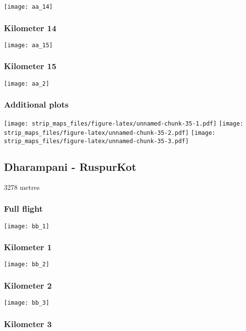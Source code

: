 \documentclass[]{article}
\begin{document}
\texttt{[image: aa\_14]}

\subsubsection{Kilometer 14}\label{kilometer-14}

\texttt{[image: aa\_15]}

\subsubsection{Kilometer 15}\label{kilometer-15}

\texttt{[image: aa\_2]}

\subsubsection{Additional plots}\label{additional-plots-26}

\texttt{[image: strip\_maps\_files/figure-latex/unnamed-chunk-35-1.pdf]}
\texttt{[image: strip\_maps\_files/figure-latex/unnamed-chunk-35-2.pdf]}
\texttt{[image: strip\_maps\_files/figure-latex/unnamed-chunk-35-3.pdf]}

\newpage

\subsection{Dharampani - RuspurKot}\label{dharampani---ruspurkot}

3278 metres

\subsubsection{Full flight}\label{full-flight-27}

\texttt{[image: bb\_1]}

\subsubsection{Kilometer 1}\label{kilometer-1-27}

\texttt{[image: bb\_2]}

\subsubsection{Kilometer 2}\label{kilometer-2-27}

\texttt{[image: bb\_3]}

\subsubsection{Kilometer 3}\label{kilometer-3-27}
\end{document}
